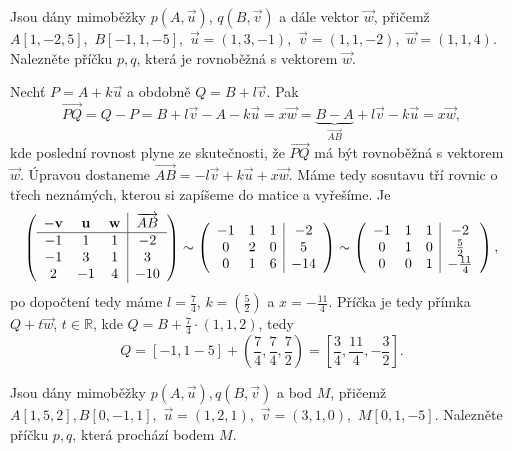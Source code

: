 \begin{priklad}\label{prmimob}
Jsou dány mimoběžky  $p(A,\vec u)$, $q(B,\vec v)$ a dále vektor $\vec w$, přičemž
$A[1,-2,5],$ $B[-1,1,-5],$ $\vec u = (1,3,-1),$ $\vec v=(1,1,-2),$ $\vec w = (1,1,4).$
Nalezněte příčku $p,q$, která je rovnoběžná s vektorem $\vec w.$
\end{priklad}

\begin{reseni}
Nechť $P=A+k\vec u$ a obdobně $Q=B+l\vec v.$ Pak
$$\overrightarrow{PQ}=Q-P=B+l\vec v - A - k\vec u=x\vec w = \underbrace{B-A}_{\overrightarrow{AB}}+l\vec v -k \vec u = x \vec w,$$
kde poslední rovnost plyne ze skutečnosti, že $\overrightarrow{PQ}$ má být rovnoběžná s vektorem $\vec w$.
Úpravou dostaneme $\overrightarrow{AB}=-l\vec v+k\vec u+x\vec w.$ Máme tedy
sosutavu tří rovnic o třech neznámých, kterou si zapíšeme do matice a vyřešíme. Je
$$
\left (
\begin{array}{c c c | c }
-\vec v & \vec u & \vec w & \overrightarrow{AB}\\
\hline
-1 & 1 & 1 & -2 \\
-1 & 3 & 1 & 3 \\
2 & -1 & 4 & -10
\end{array}
\right )\sim \left (
\begin{array}{c c c | c }
-1 & 1 & 1 & -2 \\
0 & 2 & 0 & 5 \\
0 & 1 & 6 & -14
\end{array}
\right ) \sim \left (
\begin{array}{c c c | c }
-1 & 1 & 1 & -2 \\
0 & 1 & 0 & \frac{5}{2} \\
0 & 0 & 1 & -\frac{11}{4}
\end{array}
\right ),
$$
po dopočtení tedy máme $l = \frac{7}{4}$, $k = (\frac{5}{2})$ a $x = -\frac{11}{4}$. Příčka je tedy
přímka $Q + t\vec w$, $t \in \mathbb R $, kde $Q = B+ \frac{7}{4} \cdot (1,1,2)$, tedy
$$
    Q = [-1,1-5] + \left( \frac{7}{4}, \frac{7}{4}, \frac{7}{2} \right ) = \left [\frac{3}{4}, \frac{11}{4}, -\frac{3}{2}\right].
$$
\end{reseni}

\begin{priklad}
Jsou dány mimoběžky $p(A,\vec u), q(B,\vec v)$ a bod $M$, přičemž
$A[1,5,2],B[0,-1,1],$ $\vec u=(1,2,1),$ $\vec v = (3,1,0),$ $M[0,1,-5].$  Nalezněte
příčku $p,q$, která prochází bodem $M$.
\end{priklad}

